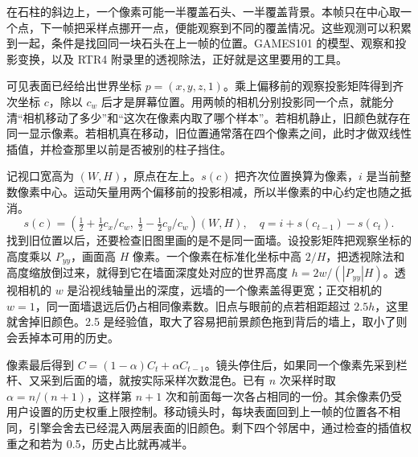 在石柱的斜边上，一个像素可能一半覆盖石头、一半覆盖背景。本帧只在中心取一个点，下一帧把采样点挪开一点，便能观察到不同的覆盖情况。这些观测可以积累到一起，条件是找回同一块石头在上一帧的位置。GAMES101 的模型、观察和投影变换，以及 RTR4 附录里的透视除法，正好就是这里要用的工具。

可见表面已经给出世界坐标 $p=(x,y,z,1)$。乘上偏移前的观察投影矩阵得到齐次坐标 $c$，除以 $c_w$ 后才是屏幕位置。用两帧的相机分别投影同一个点，就能分清“相机移动了多少”和“这次在像素内取了哪个样本”。若相机静止，旧颜色就存在同一显示像素。若相机真在移动，旧位置通常落在四个像素之间，此时才做双线性插值，并检查那里以前是否被别的柱子挡住。

记视口宽高为 $(W,H)$，原点在左上。$s(c)$ 把齐次位置换算为像素，$i$ 是当前整数像素中心。运动矢量用两个偏移前的投影相减，所以半像素的中心约定也随之抵消。
\[
 s(c)=\left(\tfrac12+\tfrac12c_x/c_w,\ \tfrac12-\tfrac12c_y/c_w\right)(W,H),\quad
 q=i+s(c_{t-1})-s(c_t).
\]
找到旧位置以后，还要检查旧图里画的是不是同一面墙。设投影矩阵把观察坐标的高度乘以 $P_{yy}$，画面高 $H$ 像素。一个像素在标准化坐标中高 $2/H$，把透视除法和高度缩放倒过来，就得到它在墙面深度处对应的世界高度 $h=2w/(|P_{yy}|H)$。透视相机的 $w$ 是沿视线轴量出的深度，远墙的一个像素盖得更宽；正交相机的 $w=1$，同一面墙退远后仍占相同像素数。旧点与眼前的点若相距超过 $2.5h$，这里就舍掉旧颜色。2.5 是经验值，取大了容易把前景颜色拖到背后的墙上，取小了则会丢掉本可用的历史。

像素最后得到 $C=(1-\alpha)C_t+\alpha C_{t-1}$。镜头停住后，如果同一个像素先采到栏杆、又采到后面的墙，就按实际采样次数混色。已有 $n$ 次采样时取 $\alpha=n/(n+1)$，这样第 $n+1$ 次和前面每一次各占相同的一份。其余像素仍受用户设置的历史权重上限控制。移动镜头时，每块表面回到上一帧的位置各不相同，引擎会舍去已经混入两层表面的旧颜色。剩下四个邻居中，通过检查的插值权重之和若为 0.5，历史占比就再减半。
\clearpage
